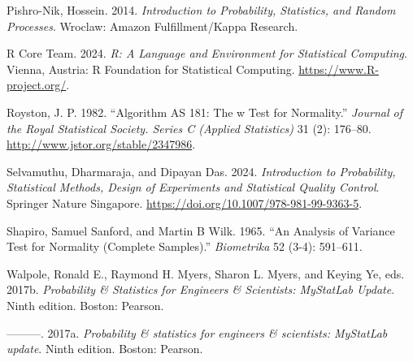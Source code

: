 \documentclass[
  11pt,
  letterpaper,
  DIV=11,
  numbers=noendperiod]{scrreprt}
\newlength{\cslhangindent}
\newenvironment{CSLReferences}[2] %
 {\begin{list}{}{%
  \setlength{\itemindent}{0pt}
  \setlength{\leftmargin}{0pt}
  \setlength{\parsep}{0pt}
  \ifodd #1
   \setlength{\leftmargin}{\cslhangindent}
   \setlength{\itemindent}{-1\cslhangindent}
  \fi
  \setlength{\itemsep}{#2\baselineskip}}}
 {\end{list}}
\begin{document}
\begin{CSLReferences}{1}{0}
Pishro-Nik, Hossein. 2014. \emph{Introduction to Probability,
Statistics, and Random Processes}. Wroclaw: Amazon Fulfillment/Kappa
Research.

R Core Team. 2024. \emph{R: A Language and Environment for Statistical
Computing}. Vienna, Austria: R Foundation for Statistical Computing.
\url{https://www.R-project.org/}.

Royston, J. P. 1982. {``Algorithm AS 181: The w Test for Normality.''}
\emph{Journal of the Royal Statistical Society. Series C (Applied
Statistics)} 31 (2): 176--80. \url{http://www.jstor.org/stable/2347986}.

Selvamuthu, Dharmaraja, and Dipayan Das. 2024. \emph{Introduction to
Probability, Statistical Methods, Design of Experiments and Statistical
Quality Control}. Springer Nature Singapore.
\url{https://doi.org/10.1007/978-981-99-9363-5}.

Shapiro, Samuel Sanford, and Martin B Wilk. 1965. {``An Analysis of
Variance Test for Normality (Complete Samples).''} \emph{Biometrika} 52
(3-4): 591--611.

Walpole, Ronald E., Raymond H. Myers, Sharon L. Myers, and Keying Ye,
eds. 2017b. \emph{Probability \& Statistics for Engineers \& Scientists:
MyStatLab Update}. Ninth edition. Boston: Pearson.

---------. 2017a. \emph{Probability \& statistics for engineers \&
scientists: MyStatLab update}. Ninth edition. Boston: Pearson.

\end{CSLReferences}
\end{document}
